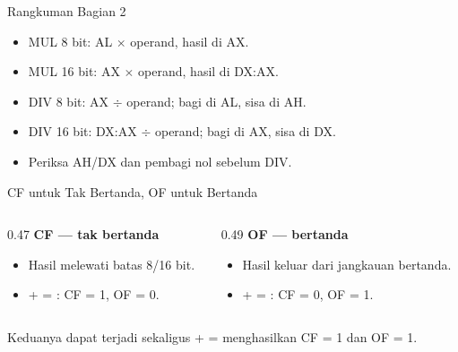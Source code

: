 \documentclass[aspectratio=169,11pt]{beamer}
\begin{document}
\begin{frame}{Rangkuman Bagian 2}
\small
\begin{itemize}
    \item MUL 8 bit: AL $\times$ operand, hasil di AX.

    \vspace{0.15em}
    \item MUL 16 bit: AX $\times$ operand, hasil di DX:AX.

    \vspace{0.15em}
    \item DIV 8 bit: AX $\div$ operand; bagi di AL, sisa di AH.

    \vspace{0.15em}
    \item DIV 16 bit: DX:AX $\div$ operand; bagi di AX, sisa di DX.

    \vspace{0.15em}
    \item Periksa AH/DX dan pembagi nol sebelum DIV.
\end{itemize}
\end{frame}


\begin{frame}{CF untuk Tak Bertanda, OF untuk Bertanda}
\small
\begin{columns}[t]
\begin{column}{0.47\textwidth}
    {\color{obeTeal}\bfseries CF --- tak bertanda}\\[0.25em]
    \begin{itemize}
        \item Hasil melewati batas 8/16 bit.
        \item {} +  = : CF = 1, OF = 0.
    \end{itemize}
\end{column}
\begin{column}{0.49\textwidth}
    {\color{obeMaroon}\bfseries OF --- bertanda}\\[0.25em]
    \begin{itemize}
        \item Hasil keluar dari jangkauan bertanda.
        \item {} +  = : CF = 0, OF = 1.
    \end{itemize}
\end{column}
\end{columns}

\vspace{0.35em}
\begin{block}{Keduanya dapat terjadi sekaligus}
\small {} +  =  menghasilkan CF = 1 dan
OF = 1.
\end{block}
\end{frame}
\end{document}
